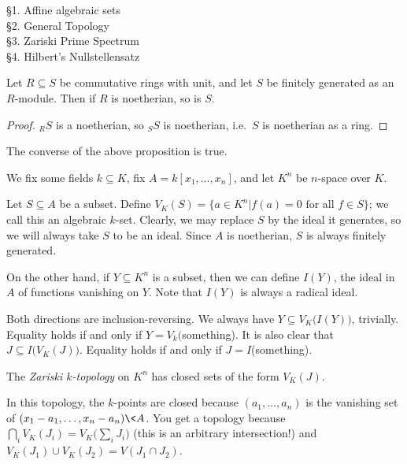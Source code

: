  \S 1. Affine algebraic sets\\
 \S 2. General Topology\\
 \S 3. Zariski Prime Spectrum\\
 \S 4. Hilbert's Nullstellensatz

 \smallskip

 \begin{proposition}[``Going Up'']
   Let $R\subseteq S$ be commutative rings with unit, and let $S$ be finitely generated
   as an $R$-module. Then if $R$ is noetherian, so is $S$.
 \end{proposition}
 \begin{proof}
   ${}_R S$ is a noetherian, so ${}_S S$ is noetherian, i.e.\ $S$ is noetherian as a
   ring.
 \end{proof}
 \begin{theorem}
   The converse of the above proposition is true.
 \end{theorem}


 We fix some fields $k\subseteq K$, fix $A=k[x_1,\dots,x_n]$, and let $K^n$ be $n$-space
 over $K$.

 Let $S\subseteq A$ be a subset. Define $V_K(S)=\{a\in K^n|f(a)=0 \text{ for all }f\in
 S\}$; we call this an algebraic $k$-set. Clearly, we may replace $S$ by the ideal it
 generates, so we will always take $S$ to be an ideal. Since $A$ is noetherian, $S$ is
 always finitely generated.

 On the other hand, if $Y\subseteq K^n$ is a subset, then we can define $I(Y)$, the
 ideal in $A$ of functions vanishing on $Y$. Note that $I(Y)$ is always a radical ideal.

 Both directions are inclusion-reversing. We always have $Y\subseteq
 V_K\bigl(I(Y)\bigr)$, trivially. Equality holds if and only if $Y=V_k($something). It is
 also clear that $J\subseteq I\bigl(V_K(J)\bigr)$. Equality holds if and only if
 $J=I$(something).

 \begin{definition}
   The \emph{Zariski $k$-topology} on $K^n$ has closed sets of the form $V_K(J)$.
 \end{definition}
 In this topology, the $k$-points are closed because $(a_1,\dots,a_n)$ is the vanishing
 set of $(x_1-a_1,\dots, x_n-a_n)\< A$. You get a topology because $\bigcap_i
 V_K(J_i)=V_K\bigl(\sum_i J_i\bigr)$ (this is an arbitrary intersection!) and
 $V_K(J_1)\cup V_K(J_2)=V(J_1\cap J_2)$.

